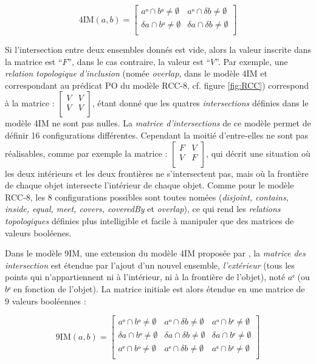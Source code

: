 \begin{equation}
  \label{eq:matrice_4IM}
  \text{4IM}(a,b) =
  \begin{bmatrix}
    aᵒ ∩ bᵒ ≠ ∅ & aᵒ ∩ δb ≠ ∅ \\
    δa ∩ bᵒ ≠ ∅ & δa ∩ δb ≠ ∅ \\
  \end{bmatrix}
\end{equation}

Si l'intersection entre deux ensembles donnés est vide, alors la
valeur inscrite dans la matrice est \enquote{\(F\)}, dans le cas
contraire, la valeur est \enquote{\(V\)}. Par exemple, une
\emph{relation topologique} \emph{d'inclusion} (nomée \emph{overlap,}
dans le modèle 4IM et correspondant au prédicat PO du modèle RCC-8,
cf. figure \ref{fig:RCC}) correspond à la matrice :
%
\(\left[
  \begin{smallmatrix}
    V&V\\
    V&V\\
  \end{smallmatrix}
\right]\),
%
étant donné que les quatres \emph{intersections} définies dans le
modèle 4IM ne sont pas nulles. La \emph{matrice d'intersections} de ce
modèle permet de définir 16 configurations différentes. Cependant la
moitié d'entre-elles ne sont pas réalisables, comme par exemple la
matrice :
%
\(\left[
  \begin{smallmatrix}
    F&V\\
    V&F\\
  \end{smallmatrix}
\right]\),
%
qui décrit une situation où les deux intérieurs et les deux frontières
ne s'intersectent pas, mais où la frontière de chaque objet intersecte
l'intérieur de chaque objet. Comme pour le modèle RCC-8, les 8
configurations possibles sont toutes nomées (\emph{disjoint, contains,
  inside, equal, meet, covers, coveredBy} et \emph{overlap}), ce qui
rend les \emph{relations topologiques} définies plus intelligible et
facile à manipuler que des matrices de valeurs booléenes.

Dans le modèle 9IM, une extension du modèle 4IM proposée par
\textcite{Egenhofer1991}, la \emph{matrice des intersection} est
étendue par l'ajout d'un nouvel ensemble, \emph{l'extérieur} (\ie tous
les points qui n'appartiennent ni à l'intérieur, ni à la frontière de
l'objet), noté \(aᵉ\) (ou \(bᵉ\) en fonction de l'objet). La matrice
initiale est alors étendue en une matrice de 9 valeurs booléennes :

\begin{equation}
  \label{eq:matrice_9IM}
  \text{9IM}(a,b) =
  \begin{bmatrix}
    aᵒ ∩ bᵒ ≠ ∅ & aᵒ ∩ δb ≠ ∅ & aᵒ ∩ bᵉ ≠ ∅ \\
    δa ∩ bᵒ ≠ ∅ & δa ∩ δb ≠ ∅ & δa ∩ bᵉ ≠ ∅ \\
    aᵉ ∩ bᵒ ≠ ∅ & aᵉ ∩ δb ≠ ∅ & aᵉ ∩ bᵉ ≠ ∅ \\
  \end{bmatrix}
\end{equation}


